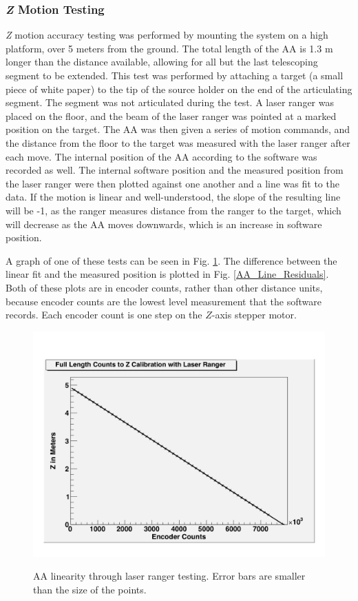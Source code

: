 \subsubsection{\emph{Z} Motion Testing}
\emph{Z} motion accuracy testing was performed by mounting the system on a high platform, over 5 meters from the ground. The total length of the AA is 1.3 m longer than the distance available, allowing for all but the last telescoping segment to be extended. This test was performed by attaching a target (a small piece of white paper) to the tip of the source holder on the end of the articulating segment. The segment was not articulated during the test. A laser ranger was placed on the floor, and the beam of the laser ranger was pointed at a marked position on the target. The AA was then given a series of motion commands, and the distance from the floor to the target was measured with the laser ranger after each move. 
The internal position of the AA according to the software was recorded as well. The internal software position and the measured position from the laser ranger were then plotted against one another and a line was fit to the data. If the motion is linear and well-understood, the slope of the resulting line will be -1, as the ranger measures distance from the ranger to the target, which will decrease as the AA moves downwards, which is an increase in software position.

A graph of one of these tests can be seen in Fig. \ref{AA_Linearity}. The difference between the linear fit and the measured position is plotted in Fig. \ref{AA_Line_Residuals}. Both of these plots are in encoder counts, rather than other distance units, because encoder counts are the lowest level measurement that the software records. Each encoder count is one step on the $Z$-axis stepper motor.

\begin{figure}
\caption{AA linearity through laser ranger testing. Error bars are smaller than the size of the points.}
\includegraphics[width=\textwidth]{AA/Z_Vs_Counts_DOWN.jpg}
\label{AA_Linearity}
\end{figure}

